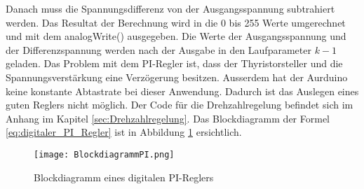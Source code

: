 Danach muss die Spannungsdifferenz von der Ausgangsspannung subtrahiert werden. Das Resultat der Berechnung wird in die 0 bis 255 Werte umgerechnet und mit dem analogWrite() ausgegeben. Die Werte der Ausgangsspannung und der Differenzspannung werden nach der Ausgabe in den Laufparameter $k-1$ geladen. Das Problem mit dem PI-Regler ist, dass der Thyristorsteller und die Spannungsverstärkung eine Verzögerung besitzen. Ausserdem hat der Aurduino keine konstante Abtastrate bei dieser Anwendung. Dadurch ist das Auslegen eines guten Reglers nicht möglich. Der Code für die Drehzahlregelung befindet sich im Anhang im Kapitel \ref{sec:Drehzahlregelung}. Das Blockdiagramm der Formel \ref{eq:digitaler_PI_Regler} ist in Abbildung \ref{fig:PIRegler} ersichtlich.

\begin{figure}[ht!]
	\centering
	\texttt{[image: BlockdiagrammPI.png]}	
	\caption{Blockdiagramm eines digitalen PI-Reglers}\label{fig:PIRegler}\cite{PI_Regler}
\end{figure}







